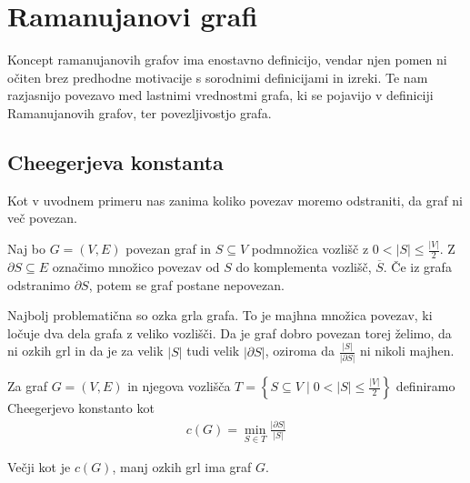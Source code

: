 \section{Ramanujanovi grafi}
Koncept ramanujanovih grafov ima enostavno definicijo, vendar njen pomen ni očiten brez predhodne motivacije s sorodnimi definicijami in izreki. Te nam razjasnijo povezavo med lastnimi vrednostmi grafa, ki se pojavijo v definiciji Ramanujanovih grafov, ter povezljivostjo grafa.
\subsection{Cheegerjeva konstanta}
Kot v uvodnem primeru nas zanima koliko povezav moremo odstraniti, da graf ni več povezan.

Naj bo \(G=(V,E)\) povezan graf in \(S\subseteq V\) podmnožica vozlišč z \(0<\lvert S \rvert \leq \frac{\lvert V \rvert}{2}\). Z \(\partial S\subseteq E\) označimo množico povezav od \(S\) do komplementa vozlišč, \(\overline{S}\). Če iz grafa odstranimo \(\partial S\), potem se graf postane nepovezan.

Najbolj problematična so ozka grla grafa. To je majhna množica povezav, ki ločuje dva dela grafa z veliko vozlišči. Da je graf dobro povezan torej želimo, da ni ozkih grl in da je za velik \(\lvert S\rvert\) tudi velik \(\lvert \partial S\rvert \), oziroma da \(\frac{\lvert S\rvert}{\lvert \partial S\rvert}\) ni nikoli majhen.

\begin{definicija}
    Za graf \(G = (V,E)\) in njegova vozlišča \(T = \left\{S\subseteq V \mid 0<\lvert S \rvert \leq \frac{\lvert V \rvert}{2}\right\}\) definiramo Cheegerjevo konstanto kot
    \begin{align*}
        c(G) = \min_{S\in T} \frac{\lvert \partial S\rvert}{\lvert S\rvert}
    \end{align*}
\end{definicija}
Večji kot je \(c(G)\), manj ozkih grl ima graf \(G\).

